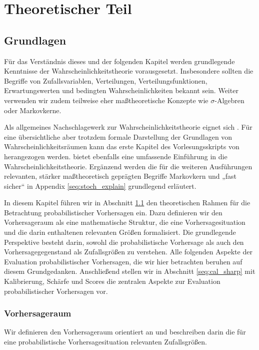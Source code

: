 \part{Theoretischer Teil}


\chapter{Grundlagen} \label{chap:Grundlagen}
Für das Verständnis dieses und der folgenden Kapitel werden grundlegende Kenntnisse der Wahrscheinlichkeitstheorie vorausgesetzt. Insbesondere sollten die Begriffe von Zufallsvariablen, Verteilungen, Verteilungsfunktionen, Erwartungswerten und bedingten Wahrscheinlichkeiten bekannt sein. Weiter verwenden wir zudem teilweise eher maßtheoretische Konzepte wie $\sigma$-Algebren oder Markovkerne.

Als allgemeines Nachschlagewerk zur Wahrscheinlichkeitstheorie eignet sich
\textcite{klenke2020wahrscheinlichkeitstheorie}. Für eine übersichtliche aber trotzdem formale
Darstellung der Grundlagen von Wahrscheinlichkeitsräumen kann das erste Kapitel des Vorlesungsskripts von \textcite{vanHandel2007} herangezogen werden. \textcite{grimmett2020probability} bietet ebenfalls eine umfassende
Einführung in die Wahrscheinlichkeitstheorie. Ergänzend werden die für die weiteren Ausführungen relevanten, stärker maßtheoretisch geprägten Begriffe Markovkern und „fast sicher“ in Appendix \ref{seq:stoch_explain} grundlegend erläutert.


In diesem Kapitel führen wir in Abschnitt \ref{seq:perd_space} den theoretischen Rahmen für die Betrachtung probabilistischer Vorhersagen ein. Dazu definieren wir den Vorhersageraum als eine mathematische Struktur, die eine Vorhersagesituation und die darin enthaltenen relevanten Größen formalisiert. Die grundlegende Perspektive besteht darin, sowohl die probabilistische Vorhersage als auch den Vorhersagegegenstand als Zufallsgrößen zu verstehen. Alle folgenden Aspekte der Evaluation probabilistischer Vorhersagen, die wir hier betrachten beruhen auf diesem Grundgedanken. Anschließend stellen wir in Abschnitt \ref{seq:cal_sharp} mit Kalibrierung, Schärfe und Scores die zentralen Aspekte zur Evaluation probabilistischer Vorhersagen vor.

\section{Vorhersageraum} \label{seq:perd_space}
Wir definieren den Vorhersageraum orientiert an \textcite[Definition 2.1]{strahl2017cross} und beschreiben darin die für eine probabilistische Vorhersagesituation relevanten Zufallsgrößen.

